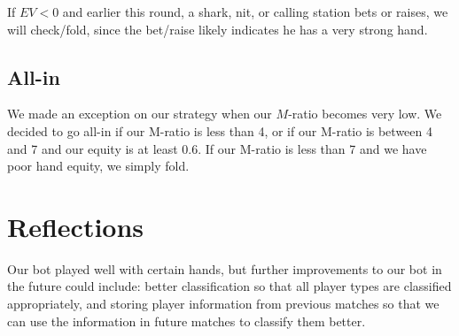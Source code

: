 \documentclass{article}
\begin{document}
If $EV < 0$ and earlier this round, a shark, nit, or calling station bets or raises, we will check/fold, since the bet/raise likely indicates he has a very strong hand.

\subsection*{All-in} We made an exception on our strategy when our $M$-ratio becomes very low. We decided to go all-in if our M-ratio is less than 4, or if our M-ratio is between 4 and 7 and our equity is at least 0.6. If our M-ratio is less than 7 and we have poor hand equity, we simply fold.

\section*{Reflections}
Our bot played well with certain hands, but further improvements to our bot in the future could include: better classification so that all player types are classified appropriately, and storing player information from previous matches so that we can use the information in future matches to classify them better.
\end{document}

